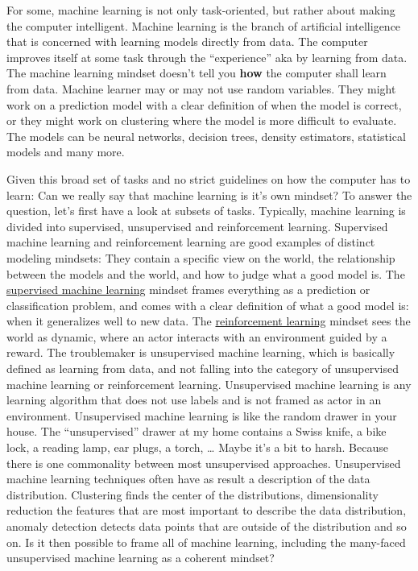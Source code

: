 \documentclass[
  10pt,
]{scrbook}
\begin{document}
For some, machine learning is not only task-oriented, but rather about making the computer intelligent.
Machine learning is the branch of artificial intelligence that is concerned with learning models directly from data.
The computer improves itself at some task through the ``experience'' aka by learning from data.
The machine learning mindset doesn't tell you \textbf{how} the computer shall learn from data.
Machine learner may or may not use random variables.
They might work on a prediction model with a clear definition of when the model is correct, or they might work on clustering where the model is more difficult to evaluate.
The models can be neural networks, decision trees, density estimators, statistical models and many more.

Given this broad set of tasks and no strict guidelines on how the computer has to learn: Can we really say that machine learning is it's own mindset?
To answer the question, let's first have a look at subsets of tasks.
Typically, machine learning is divided into supervised, unsupervised and reinforcement learning.
Supervised machine learning and reinforcement learning are good examples of distinct modeling mindsets: They contain a specific view on the world, the relationship between the models and the world, and how to judge what a good model is.
The \protect\hyperlink{supervised-ml}{supervised machine learning} mindset frames everything as a prediction or classification problem, and comes with a clear definition of what a good model is: when it generalizes well to new data.
The \protect\hyperlink{reinforcement-learning}{reinforcement learning} mindset sees the world as dynamic, where an actor interacts with an environment guided by a reward.
The troublemaker is unsupervised machine learning, which is basically defined as learning from data, and not falling into the category of unsupervised machine learning or reinforcement learning.
Unsupervised machine learning is any learning algorithm that does not use labels and is not framed as actor in an environment.
Unsupervised machine learning is like the random drawer in your house.
The ``unsupervised'' drawer at my home contains a Swiss knife, a bike lock, a reading lamp, ear plugs, a torch, \ldots{}
Maybe it's a bit to harsh.
Because there is one commonality between most unsupervised approaches.
Unsupervised machine learning techniques often have as result a description of the data distribution.
Clustering finds the center of the distributions, dimensionality reduction the features that are most important to describe the data distribution, anomaly detection detects data points that are outside of the distribution and so on.
Is it then possible to frame all of machine learning, including the many-faced unsupervised machine learning as a coherent mindset?
\end{document}
